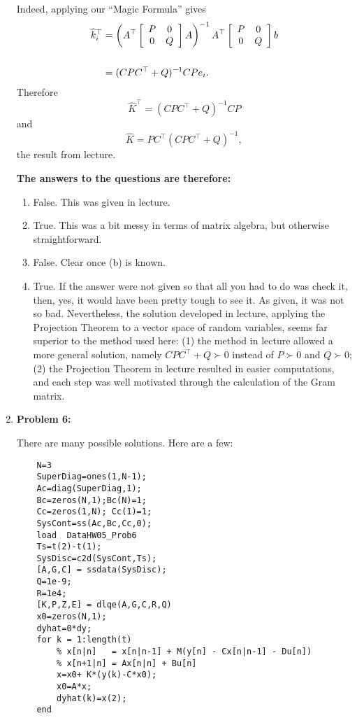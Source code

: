 \documentclass[letterpaper]{article}
\begin{document}
\begin{enumerate}
Indeed, applying our ``Magic Formula'' gives
 \begin{align*}
 \widehat{k}_i^\top &= \left( A^\top \left[ \begin{array}{cc}  P & 0  \\ 0& Q \end{array} \right]A \right)^{-1} A^\top  \left[ \begin{array}{cc}  P & 0  \\ 0& Q \end{array} \right] b \bigskip \\
 \\
 & = (CPC^\top + Q)^{-1} CPe_i.
 \end{align*}
Therefore
 $$ \widehat{K}^\top =  (CPC^\top + Q)^{-1} CP  $$
 and
  $$ \widehat{K} = PC^\top  (CPC^\top + Q)^{-1}, $$
  the result from lecture.


\textbf{The answers to the questions are therefore:}
\begin{enumerate}
\setlength{\itemsep}{.1in}
\renewcommand{\labelenumi}{(\alph{enumi})}


\item False. This was given in lecture.

\item True.  This was a bit messy in terms of matrix algebra, but otherwise straightforward.

\item False.  Clear once (b) is known.

\item True.  If the answer were not given so that all you had to do was check it, then, yes, it would have been pretty tough to see it. As given, it was not so bad. Nevertheless, the solution developed in lecture, applying the Projection Theorem to a vector space of random variables, seems far superior to the method used here: (1) the method in lecture allowed a more general solution, namely $CPC^\top + Q \succ 0$ instead of $P\succ0$ and $Q\succ0$; (2) the Projection Theorem in lecture resulted in easier computations, and each step was well motivated through the calculation of the Gram matrix.

\end{enumerate}

\newpage

\item \noindent \textbf{Problem 6:}

There are many possible solutions. Here are a few:

\begin{verbatim}
    N=3
    SuperDiag=ones(1,N-1);
    Ac=diag(SuperDiag,1);
    Bc=zeros(N,1);Bc(N)=1;
    Cc=zeros(1,N); Cc(1)=1;
    SysCont=ss(Ac,Bc,Cc,0);
    load  DataHW05_Prob6
    Ts=t(2)-t(1);
    SysDisc=c2d(SysCont,Ts);
    [A,G,C] = ssdata(SysDisc);
    Q=1e-9;
    R=1e4;
    [K,P,Z,E] = dlqe(A,G,C,R,Q)
    x0=zeros(N,1);
    dyhat=0*dy;
    for k = 1:length(t)
        % x[n|n]   = x[n|n-1] + M(y[n] - Cx[n|n-1] - Du[n])
        % x[n+1|n] = Ax[n|n] + Bu[n]
        x=x0+ K*(y(k)-C*x0);
        x0=A*x;
        dyhat(k)=x(2);
    end


\end{verbatim}
\end{enumerate}
\end{document}
